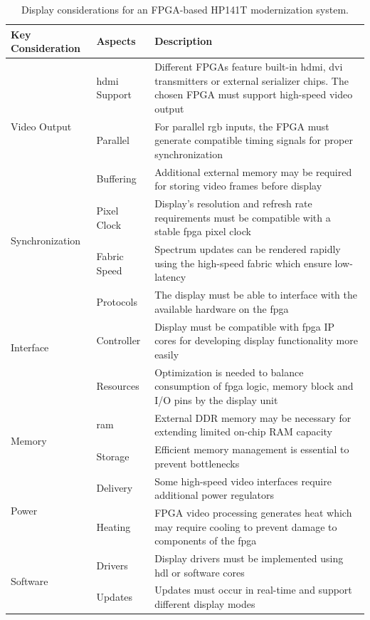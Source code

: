 \documentclass[class=report,11pt,crop=false]{standalone}
\begin{document}
	\begin{table}[ht!]
		\centering
		\begin{tabular}{|m{8em}|m{10em}|m{22em}|}
			\hline
			\textbf{Key Consideration} & \textbf{Aspects} & \textbf{Description} \\
			\hline
			\multirow{3}{*}{Video Output} 
			& \acrshort{hdmi} Support & Different FPGAs feature built-in \acrshort{hdmi}, \acrshort{dvi} transmitters or external serializer chips. The chosen FPGA must support high-speed video output \\
			\cline{2-3}
			& Parallel & For parallel \acrshort{rgb} inputs, the FPGA must generate compatible timing signals for proper synchronization \\
			\cline{2-3}
			& Buffering & Additional external memory may be required for storing video frames before display \\
			\hline
			
			\multirow{2}{*}{Synchronization} 
			& Pixel Clock & Display’s resolution and refresh rate requirements must be compatible with a stable \acrshort{fpga} pixel clock \\
			\cline{2-3}
			& Fabric Speed & Spectrum updates can be rendered rapidly using the high-speed fabric which ensure low-latency \\
			\hline
			
			\multirow{3}{*}{Interface} 
			& Protocols & The display must be able to interface with the available hardware on the \acrshort{fpga} \\
			\cline{2-3}
			& Controller & Display must be compatible with \acrshort{fpga} IP cores for developing display functionality more easily\\
			\cline{2-3}
			& Resources & Optimization is needed to balance consumption of \acrshort{fpga} logic, memory block and I/O pins by the display unit \\
			\hline
			
			\multirow{2}{*}{Memory} 
			& \acrshort{ram} & External DDR memory may be necessary for extending limited on-chip RAM capacity \\
			\cline{2-3}
			& Storage & Efficient memory management is essential to prevent bottlenecks \\
			\hline
			
			\multirow{2}{*}{Power} 
			& Delivery & Some high-speed video interfaces require additional power regulators\\
			\cline{2-3}
			& Heating & FPGA video processing generates heat which may require cooling to prevent damage to components of the \acrshort{fpga} \\
			\hline
			
			\multirow{2}{*}{Software} 
			& Drivers & Display drivers must be implemented using \acrshort{hdl} or software cores\\
			\cline{2-3}
			& Updates & Updates must occur in real-time and support different display modes \\
			\hline
		\end{tabular}
		\caption{Display considerations for an FPGA-based HP141T modernization system.}
		\label{tab:fpga-display-options}
	\end{table}
	
\end{document}
